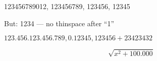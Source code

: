 \documentclass{article}
\begin{document}
    
123456789012, 123456789, 123456, 12345

But: 1234 --- no thinspace after ``1''

$123.456.123.456.789, 0.12345, 123456+23423432$

\begin{equation*}
\sqrt{x^2+100.000}
\end{equation*}
\end{document}
